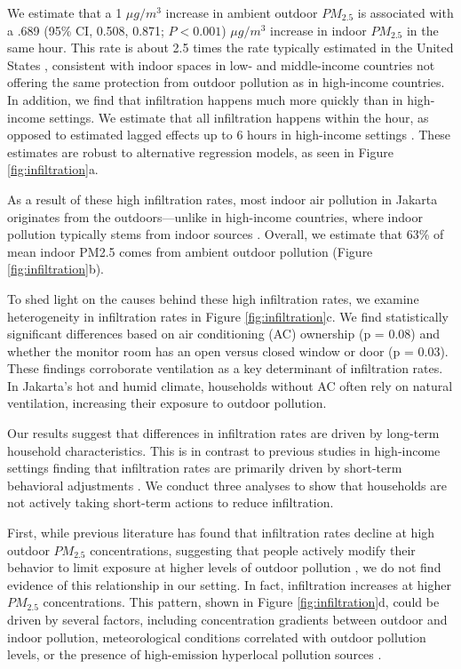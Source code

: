 \documentclass[9pt,twocolumn,twoside]{pnas-new}
\begin{document}
We estimate that a 1 $\mu g /m^{3}$ increase in ambient outdoor $PM_{2.5}$ is associated with a .689 (95\% CI, 0.508, 0.871; $P < 0.001$) $\mu g /m^{3}$ increase in indoor $PM_{2.5}$ in the same hour. This rate is about 2.5 times the rate typically estimated in the United States \citep{lunderberg_assessing_2023}, consistent with indoor spaces in low- and middle-income countries not offering the same protection from outdoor pollution as in high-income countries. In addition, we find that infiltration happens much more quickly than in high-income settings. We estimate that all infiltration happens within the hour, as opposed to estimated lagged effects up to 6 hours in high-income settings \citep{burke_exposures_2022, lunderberg_assessing_2023}. These estimates are robust to alternative regression models, as seen in Figure \ref{fig:infiltration}a. 

As a result of these high infiltration rates, most indoor air pollution in Jakarta originates from the outdoors—unlike in high-income countries, where indoor pollution typically stems from indoor sources \citep{metcalfe_making_2025}. Overall, we estimate that 63\% of mean indoor PM2.5 comes from ambient outdoor pollution (Figure \ref{fig:infiltration}b).


To shed light on the causes behind these high infiltration rates, we examine heterogeneity in infiltration rates in Figure \ref{fig:infiltration}c. We find statistically significant differences based on air conditioning (AC) ownership (p = 0.08) and whether the monitor room has an open versus closed window or door (p = 0.03). These findings corroborate ventilation as a key determinant of infiltration rates. In Jakarta’s hot and humid climate, households without AC often rely on natural ventilation, increasing their exposure to outdoor pollution. 

Our results suggest that differences in infiltration rates are driven by long-term household characteristics. This is in contrast to previous studies in high-income settings finding that infiltration rates are primarily driven by short-term behavioral adjustments \citep{burke_exposures_2022, baquie_know_2024}. We conduct three analyses to show that  households are not actively taking short-term actions to reduce infiltration.

First, while previous literature has found that infiltration rates decline at high outdoor $PM_{2.5}$ concentrations, suggesting that people actively modify their behavior to limit exposure at higher levels of outdoor pollution \citep{burke_exposures_2022,lunderberg_assessing_2023}, we do not find evidence of this relationship in our setting. In fact, infiltration increases at higher $PM_{2.5}$ concentrations. This pattern, shown in Figure \ref{fig:infiltration}d, could be driven by several factors, including concentration gradients between outdoor and indoor pollution, meteorological conditions correlated with outdoor pollution levels, or the presence of high-emission hyperlocal pollution sources \citep{lunderberg_assessing_2023,macneill_factors_2012}.
\end{document}
